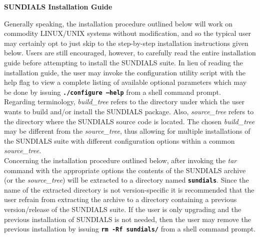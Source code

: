 \documentclass[10pt]{report}
\begin{document}
\begin{center}
\textbf{\Large SUNDIALS Installation Guide}
\end{center}
\setlength{\parindent}{0.5cm}

Generally speaking, the installation procedure outlined below will work on commodity \small LINUX\normalsize/\small UNIX \normalsize systems without modification, and so the typical user may certainly opt to just skip to the step-by-step installation instructions given below.  Users are still encouraged, however, to carefully read the entire installation guide before attempting to install the \small SUNDIALS \normalsize suite.  In lieu of reading the installation guide, the user may invoke the configuration utility script with the help flag to view a complete listing of available optional parameters which may be done by issuing \texttt{\textbf{./configure --help}} from a shell command prompt.
\\

Regarding terminology, \textit{build\_tree} refers to the directory under which the user wants to build and/or install the \small SUNDIALS \normalsize package.  Also, \textit{source\_tree} refers to the directory where the \small SUNDIALS \normalsize source code is located.  The chosen \textit{build\_tree} may be different from the \textit{source\_tree}, thus allowing for multiple installations of the \small SUNDIALS \normalsize suite with different configuration options within a common \textit{source\_tree}.
\\

Concerning the installation procedure outlined below, after invoking the \textit{tar} command with the appropriate options the contents of the \small SUNDIALS \normalsize archive (or the \textit{source\_tree}) will be extracted to a directory named \texttt{\textbf{sundials}}.  Since the name of the extracted directory is not version-specific it is recommended that the user refrain from extracting the archive to a directory containing a previous version/release of the \small SUNDIALS \normalsize suite.  If the user is only upgrading and the previous installation of \small SUNDIALS \normalsize is not needed, then the user may remove the previous installation by issuing \texttt{\textbf{rm -Rf}}\texttt{\textbf{ sundials/}} from a shell command prompt.
\\
\end{document}
